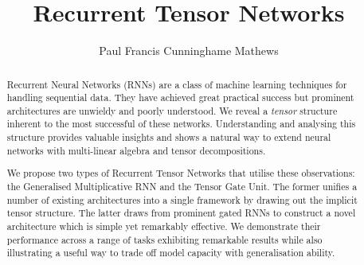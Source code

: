 \documentclass[11pt, a4paper, twoside, openright]{report}
\title{Recurrent Tensor Networks}
\author{Paul Francis Cunninghame Mathews}
\date{}
\begin{document}
\frontmatter



\begin{abstract}

Recurrent Neural Networks (RNNs) are a class of machine learning techniques for handling sequential
data. They have achieved great practical success but
prominent architectures are unwieldy and poorly understood.
We reveal a \emph{tensor} structure inherent
to the most successful of these networks. 
Understanding and analysing this structure provides valuable insights
and shows a natural way to extend neural networks with multi-linear algebra and tensor
decompositions.

We propose two types of Recurrent Tensor Networks that utilise these observations:
the Generalised Multiplicative RNN and the Tensor Gate Unit. The former unifies a number of existing
architectures into a single framework by drawing out the implicit tensor structure. The latter draws
from prominent gated RNNs to construct a novel architecture which is simple yet remarkably effective.
We demonstrate their performance across a range of tasks exhibiting remarkable results
while also illustrating a
useful way to trade off model capacity with generalisation ability.
\end{abstract}


\maketitle



\tableofcontents



\mainmatter









\appendix



\backmatter



%
%
%
\printbibliography
\end{document}
